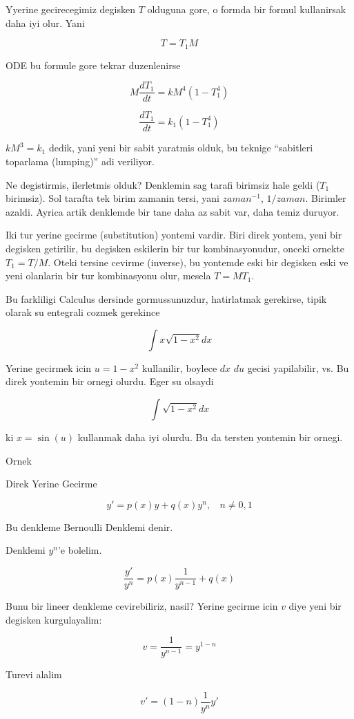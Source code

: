 \documentclass[12pt,fleqn]{article}\usepackage{../common}
\begin{document}
Yyerine gecirecegimiz degisken $T$ olduguna gore, o formda bir formul
kullanirsak daha iyi olur. Yani

\[ T = T_1M \]

ODE bu formule gore tekrar duzenlenirse

\[ M\frac{dT_1}{dt} = kM^4(1-T_1^4)\]

\[ \frac{dT_1}{dt} = k_1(1-T_1^4)  \]

$kM^3 = k_1$ dedik, yani yeni bir sabit yaratmis olduk, bu teknige
``sabitleri toparlama (lumping)'' adi veriliyor.

Ne degistirmis, ilerletmis olduk? Denklemin sag tarafi birimsiz hale
geldi ($T_1$ birimsiz). Sol tarafta tek birim zamanin tersi, yani
$zaman^{-1}$, $1/zaman$. Birimler azaldi. Ayrica artik denklemde bir
tane daha az sabit var, daha temiz duruyor.

Iki tur yerine gecirme (substitution) yontemi vardir. Biri direk
yontem, yeni bir degisken getirilir, bu degisken eskilerin bir tur
kombinasyonudur, onceki ornekte $T_1 = T / M$. Oteki tersine cevirme
(inverse), bu yontemde eski bir degisken eski ve yeni olanlarin bir
tur kombinasyonu olur, mesela $T = MT_1$. 

Bu farkliligi Calculus dersinde gormussunuzdur, hatirlatmak gerekirse,
tipik olarak su entegrali cozmek gerekince

\[ \int x \sqrt{1-x^2} dx \]

Yerine gecirmek icin $u = 1-x^2$ kullanilir, boylece $dx$ $du$ gecisi
yapilabilir, vs. Bu direk yontemin bir ornegi olurdu. Eger su olsaydi

\[ \int \sqrt{1-x^2} dx \]

ki $x = \sin(u)$ kullanmak daha iyi olurdu. Bu da tersten yontemin bir ornegi.

Ornek

Direk Yerine Gecirme

\[ y' = p(x)y + q(x)y^n, \ \ \ \  n \neq 0,1 \]

Bu denkleme Bernoulli Denklemi denir. 

Denklemi $y^n$'e bolelim. 

\[ \frac{y'}{y^n} = p(x) \frac{1}{y^{n-1}} + q(x) \]

Bunu bir lineer denkleme cevirebiliriz, nasil? Yerine gecirme icin $v$
diye yeni bir degisken kurgulayalim:

\[ v = \frac{1}{y^{n-1}} = y^{1-n}\]

Turevi alalim

\[ v' = (1-n)\frac{1}{y^n}y' \]
\end{document}
